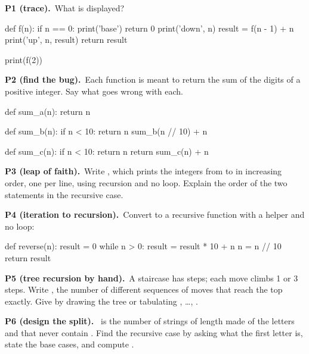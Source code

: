 \documentclass[10pt]{scrartcl}
\begin{document}
\begin{prob}\textbf{P1 (trace).}\ What is displayed?
\begin{py}
def f(n):
    if n == 0:
        print('base')
        return 0
    print('down', n)
    result = f(n - 1) + n
    print('up', n, result)
    return result

print(f(2))
\end{py}
\end{prob}
\begin{prob}\textbf{P2 (find the bug).}\ Each function is meant to return the sum of the digits of a positive integer. Say what goes wrong with each.
\begin{py}
def sum_a(n):
    return n %

def sum_b(n):
    if n < 10:
        return n
    sum_b(n // 10) + n %

def sum_c(n):
    if n < 10:
        return n
    return sum_c(n) + n %
\end{py}
\end{prob}
\begin{prob}\textbf{P3 (leap of faith).}\ Write , which prints the integers from  to  in increasing order, one per line, using recursion and no loop. Explain the order of the two statements in the recursive case.
\end{prob}
\begin{prob}\textbf{P4 (iteration to recursion).}\ Convert to a recursive function with a helper and no loop:
\begin{py}
def reverse(n):
    result = 0
    while n > 0:
        result = result * 10 + n %
        n = n // 10
    return result
\end{py}
\end{prob}
\begin{prob}\textbf{P5 (tree recursion by hand).}\ A staircase has  steps; each move climbs 1 or 3 steps. Write , the number of different sequences of moves that reach the top exactly. Give  by drawing the tree or tabulating , \dots, .
\end{prob}
\begin{prob}\textbf{P6 (design the split).}\  is the number of strings of length  made of the letters  and  that never contain . Find the recursive case by asking what the first letter is, state the base cases, and compute .
\end{prob}
\end{document}
